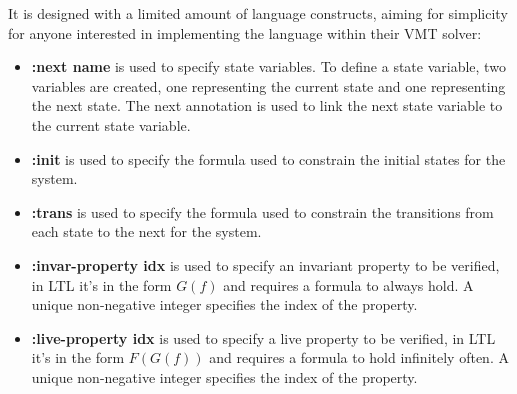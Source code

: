 It is designed with a limited amount of language constructs, aiming for simplicity for anyone interested in implementing the language within their VMT solver:
\begin{itemize}[noitemsep]
    \item \textbf{:next name} is used to specify state variables. To define a state variable, two variables are created, one representing the current state and one representing the next state. The next annotation is used to link the next state variable to the current state variable.
    \item \textbf{:init} is used to specify the formula used to constrain the initial states for the system.
    \item \textbf{:trans} is used to specify the formula used to constrain the transitions from each state to the next for the system.
    \item \textbf{:invar-property idx} is used to specify an invariant property to be verified, in LTL it's in the form \begin{math} G (f) \end{math} and requires a formula to always hold.  A unique non-negative integer specifies the index of the property.
    \item \textbf{:live-property idx} is used to specify a live property to be verified, in LTL it's in the form \begin{math} F (G (f))\end{math} and requires a formula to hold infinitely often. A unique non-negative integer specifies the index of the property.
\end{itemize}
\cite{vmt-lib-paper} %

